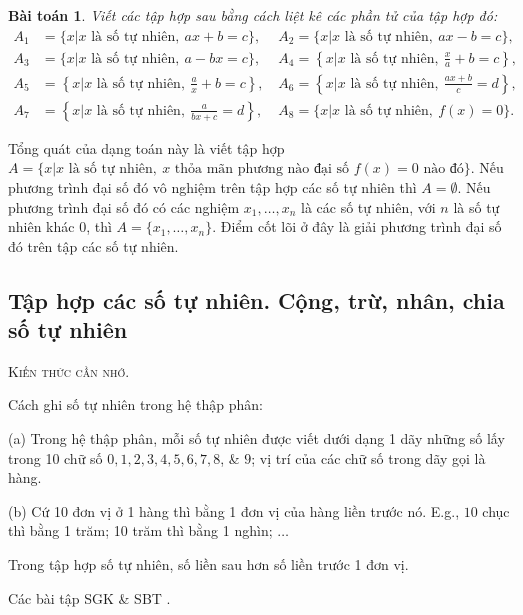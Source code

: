 \documentclass{article}
\numberwithin{equation}{section}
\newtheorem{baitoan}{Bài toán}[section]
\begin{document}
\begin{baitoan}
	Viết các tập hợp sau bằng cách liệt kê các phần tử của tập hợp đó:
	\begin{align*}
		A_1 &= \{x|x\mbox{ là số tự nhiên},\ ax + b = c\},\ && A_2 = \{x|x\mbox{ là số tự nhiên},\ ax - b = c\},\\
		A_3 &= \{x|x\mbox{ là số tự nhiên},\ a - bx = c\},\ && A_4 = \left\{x|x\mbox{ là số tự nhiên},\ \frac{x}{a} + b = c\right\},\\
		A_5 &= \left\{x|x\mbox{ là số tự nhiên},\ \frac{a}{x} + b = c\right\},\ && A_6 = \left\{x|x\mbox{ là số tự nhiên},\ \frac{ax + b}{c} = d\right\},\\
		A_7 &= \left\{x|x\mbox{ là số tự nhiên},\ \frac{a}{bx + c} = d\right\},\ && A_8 = \{x|x\mbox{ là số tự nhiên},\ f(x) = 0\}.
	\end{align*}
\end{baitoan}
Tổng quát của dạng toán này là viết tập hợp $A = \{x|x\mbox{ là số tự nhiên},\ x \mbox{ thỏa mãn phương nào đại số }f(x) = 0\mbox{ nào đó}\}$. Nếu phương trình đại số đó vô nghiệm trên tập hợp các số tự nhiên thì $A = \emptyset$. Nếu phương trình đại số đó có các nghiệm $x_1,\ldots,x_n$ là các số tự nhiên, với $n$ là số tự nhiên khác 0, thì $A = \{x_1,\ldots,x_n\}$. Điểm cốt lõi ở đây là giải phương trình đại số đó trên tập các số tự nhiên.

\subsection{Tập hợp các số tự nhiên. Cộng, trừ, nhân, chia số tự nhiên}
\textsc{Kiến thức cần nhớ.}
\begin{tcolorbox}
	Cách ghi số tự nhiên trong hệ thập phân:
	\begin{enumerate*}
		\item[(a)] Trong hệ thập phân, mỗi số tự nhiên được viết dưới dạng 1 dãy những số lấy trong 10 chữ số $0,1,2,3,4,5,6,7,8$, \& $9$; vị trí của các chữ số trong dãy gọi là hàng.
		\item[(b)] Cứ 10 đơn vị ở 1 hàng thì bằng 1 đơn vị của hàng liền trước nó. E.g., $10$ chục thì bằng 1 trăm; 10 trăm thì bằng 1 nghìn; $\ldots$
	\end{enumerate*}
	Trong tập hợp số tự nhiên, số liền sau hơn số liền trước 1 đơn vị.
\end{tcolorbox}
Các bài tập SGK \cite[\textbf{1}--\textbf{4}, pp. 7--8]{SGK_Toan_6_Canh_Dieu_tap_1} \& SBT \cite[Ví dụ 1--3, pp. 7--8; \textbf{9}--\textbf{14}, pp. 8--9]{SBT_Toan_6_Canh_Dieu_tap_1}.
\end{document}
